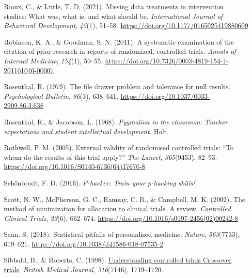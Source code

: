 \documentclass{krantz}
\newlength{\cslhangindent}
\newlength{\cslentryspacingunit} %
\newenvironment{CSLReferences}[2] %
{%
\setlength{\parindent}{0pt}
\ifodd #1
\let\oldpar\par
\def\par{\hangindent=\cslhangindent\oldpar}
\fi
\setlength{\parskip}{#2\cslentryspacingunit}
}%
{}
\begin{document}
\begin{CSLReferences}{1}{0}
\leavevmode{}%
Rioux, C., \& Little, T. D. (2021). Missing data treatments in intervention studies: {What} was, what is, and what should be. \emph{International Journal of Behavioral Development}, \emph{45}(1), 51--58. \url{https://doi.org/10.1177/0165025419880609}

\leavevmode{}%
Robinson, K. A., \& Goodman, S. N. (2011). A systematic examination of the citation of prior research in reports of randomized, controlled trials. \emph{Annals of Internal Medicine}, \emph{154}(1), 50--55. \url{https://doi.org/10.7326/0003-4819-154-1-201101040-00007}

\leavevmode{}%
Rosenthal, R. (1979). The file drawer problem and tolerance for null results. \emph{Psychological Bulletin}, \emph{86}(3), 638--641. \url{https://doi.org/10.1037/0033-2909.86.3.638}

\leavevmode{}%
Rosenthal, R., \& Jacobson, L. (1968). \emph{Pygmalion in the classroom: {Teacher} expectations and student intellectual development}. {Holt}.

\leavevmode{}%
Rothwell, P. M. (2005). External validity of randomised controlled trials: {``{To} whom do the results of this trial apply?''} \emph{The Lancet}, \emph{365}(9453), 82--93. \url{https://doi.org/10.1016/S0140-6736(04)17670-8}

\leavevmode{}%
Schönbrodt, F. D. (2016). \emph{P-hacker: {Train} your p-hacking skills!}

\leavevmode{}%
Scott, N. W., McPherson, G. C., Ramsay, C. R., \& Campbell, M. K. (2002). The method of minimization for allocation to clinical trials. A review. \emph{Controlled Clinical Trials}, \emph{23}(6), 662--674. \url{https://doi.org/10.1016/s0197-2456(02)00242-8}

\leavevmode{}%
Senn, S. (2018). Statistical pitfalls of personalized medicine. \emph{Nature}, \emph{563}(7733), 619--621. \url{https://doi.org/10.1038/d41586-018-07535-2}

\leavevmode{}%
Sibbald, B., \& Roberts, C. (1998). \href{https://www.ncbi.nlm.nih.gov/pmc/articles/PMC1113275}{Understanding controlled trials {Crossover} trials}. \emph{British Medical Journal}, \emph{316}(7146), 1719--1720.


\end{CSLReferences}
\end{document}
